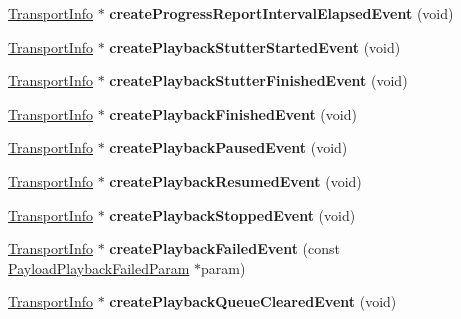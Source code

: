 \begin{DoxyCompactItemize}
\hyperlink{classAlexaEvent_1_1TransportInfo}{Transport\+Info} $\ast$ {\bfseries create\+Progress\+Report\+Interval\+Elapsed\+Event} (void)
\item 
\mbox{\label{classAlexaEvent_1_1EventAudioPlayerModul_a510a692a876b14da81942c418a0be495}} 
\hyperlink{classAlexaEvent_1_1TransportInfo}{Transport\+Info} $\ast$ {\bfseries create\+Playback\+Stutter\+Started\+Event} (void)
\item 
\mbox{\label{classAlexaEvent_1_1EventAudioPlayerModul_a5be5d00a64353d9225d1dfe2b4337089}} 
\hyperlink{classAlexaEvent_1_1TransportInfo}{Transport\+Info} $\ast$ {\bfseries create\+Playback\+Stutter\+Finished\+Event} (void)
\item 
\mbox{\label{classAlexaEvent_1_1EventAudioPlayerModul_a4a5f43b899fc9e3fd601e17b5117cc49}} 
\hyperlink{classAlexaEvent_1_1TransportInfo}{Transport\+Info} $\ast$ {\bfseries create\+Playback\+Finished\+Event} (void)
\item 
\mbox{\label{classAlexaEvent_1_1EventAudioPlayerModul_af02727a23fda3dfe3606e4d6cd3d8ce6}} 
\hyperlink{classAlexaEvent_1_1TransportInfo}{Transport\+Info} $\ast$ {\bfseries create\+Playback\+Paused\+Event} (void)
\item 
\mbox{\label{classAlexaEvent_1_1EventAudioPlayerModul_abfa63ace96dd666cd42e786656551a5a}} 
\hyperlink{classAlexaEvent_1_1TransportInfo}{Transport\+Info} $\ast$ {\bfseries create\+Playback\+Resumed\+Event} (void)
\item 
\mbox{\label{classAlexaEvent_1_1EventAudioPlayerModul_aafc55793cce64a1813a5f1cd348ac2a8}} 
\hyperlink{classAlexaEvent_1_1TransportInfo}{Transport\+Info} $\ast$ {\bfseries create\+Playback\+Stopped\+Event} (void)
\item 
\mbox{\label{classAlexaEvent_1_1EventAudioPlayerModul_a2087b6d8baef6bd329694e865a189aad}} 
\hyperlink{classAlexaEvent_1_1TransportInfo}{Transport\+Info} $\ast$ {\bfseries create\+Playback\+Failed\+Event} (const \hyperlink{structAlexaEvent_1_1PayloadPlaybackFailedParam}{Payload\+Playback\+Failed\+Param} $\ast$param)
\item 
\mbox{\label{classAlexaEvent_1_1EventAudioPlayerModul_a1e0aa21d9dc375e89756aae38af10774}} 
\hyperlink{classAlexaEvent_1_1TransportInfo}{Transport\+Info} $\ast$ {\bfseries create\+Playback\+Queue\+Cleared\+Event} (void)
\end{DoxyCompactItemize}
